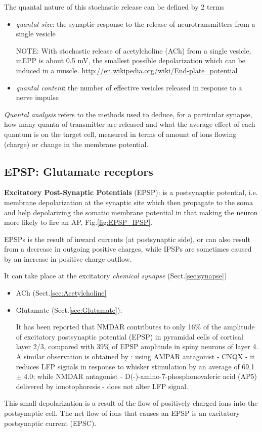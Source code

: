 The quantal nature of this stochastic release can be defined by 2 terms
\begin{itemize}
  \item {\it quantal size}: the synaptic response to the release of
  neurotransmitters from a single vesicle

NOTE: With stochastic release of acetylcholine (ACh) from a single vesicle, mEPP
is about 0.5 mV, the smallest possible depolarization which can be induced in a
muscle. \url{http://en.wikipedia.org/wiki/End-plate_potential}
  
  \item {\it quantal content}: the number of effective vesicles released in
  response to a nerve impulse
\end{itemize}
{\it Quantal analysis} refers to the methods used to deduce, for a particular
synapse, how many quanta of transmitter are released and what the average effect of each
quantum is on the target cell, measured in terms of amount of ions flowing
(charge) or change in the membrane potential.


\subsection{EPSP: Glutamate receptors}
\label{sec:EPSP_mechanism}
\label{sec:EPSP}

{\bf Excitatory Post-Synaptic Potentials} (EPSP): is a postsynaptic potential,
i.e. membrane depolarization at the synaptic site which then propagate to the
soma and help depolarizing the somatic membrane potential in that making the
neuron more likely to fire an AP, Fig.\ref{fig:EPSP_IPSP}.

EPSPs is the result of inward currents (at postsynaptic side), or can also
result from a decrease in outgoing positive charges, while IPSPs are sometimes
caused by an increase in positive charge outflow.

It can take place at the excitatory {\it chemical synapse}
(Sect.\ref{sec:synapse})
\begin{itemize}
  \item ACh (Sect.\ref{sec:Acetylcholine}
  
  \item Glutamate (Sect.\ref{sec:Glutamate}):

It has been reported that NMDAR contributes to only 16\% of the amplitude of
excitatory postsynaptic potential (EPSP) in pyramidal cells of cortical layer
2/3, compared with 39\% of EPSP amplitude in spiny neurons of layer 4.
A similar observation is obtained by \citep{wang2006}: using AMPAR antagonist -
CNQX - it reduces LFP signals in response to whisker stimulation by an average
of 69.1$\pm$ 4.0; while NMDAR antagonist - D(-)-amino-7-phosphonovaleric acid
(AP5) delivered by ionotophoresis - does not alter LFP signal.

\end{itemize} 
This small depolarization is a result of the flow of positively charged ions into
the postsynaptic cell.  The net flow of ions that causes an EPSP is an
excitatory postsynaptic current (EPSC).

